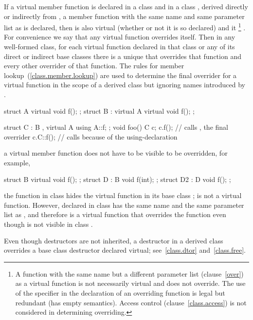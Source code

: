 \pnum
If a virtual member function  is declared in a class
 and in a class , derived directly or
indirectly from , a member function  with the same
name and same parameter list as
 is declared, then  is also virtual
(whether or not it is so declared) and it \footnote{A function with the same name but a different parameter list
(clause~\ref{over}) as a virtual function is not necessarily virtual and
does not override. The use of the  specifier in the
declaration of an overriding function is legal but redundant (has empty
semantics). Access control (clause~\ref{class.access}) is not considered in
determining overriding.}
. For convenience we say that any virtual function
overrides itself.
%
Then in any well-formed class, for each virtual function declared in that
class or any of its direct or indirect base classes there is a unique
 that overrides that function and every other
overrider of that function. The rules for member
lookup~(\ref{class.member.lookup}) are used to determine the final overrider
for a virtual function in the scope of a derived class but ignoring names
introduced by .
\enterexample
\begin{codeblock}
struct A {
	virtual void f();
};
struct B : virtual A {
	virtual void f();
};

struct C : B , virtual A {
	using A::f;
};
void foo() {
	C c;
	c.f();			// calls , the final overrider
	c.C::f();		// calls  because of the using-declaration
}
\end{codeblock}
\exitexampleb

\pnum
\enternote
a virtual member function does not have to be visible to be overridden,
for example,
\begin{codeblock}
struct B {
	virtual void f();
};
struct D : B {
	void f(int);
};
struct D2 : D {
	void f();
};
\end{codeblock}
the function  in class  hides the virtual
function  in its base class ;  is
not a virtual function. However,  declared in class
 has the same name and the same parameter list as
, and therefore is a virtual function that overrides the
function  even though  is not visible in
class .
\exitnote

\pnum
Even though destructors are not inherited, a destructor in a derived
class overrides a base class destructor declared virtual;
see~\ref{class.dtor} and~\ref{class.free}.

